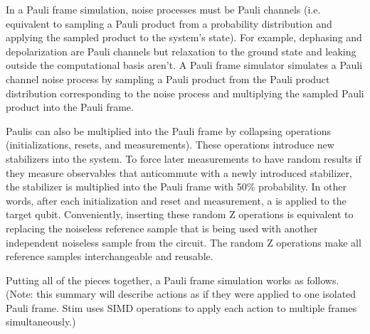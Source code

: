 \documentclass[onecolumn,unpublished]{quantumarticle}
\theoremstyle{definition}
\theoremstyle{definition}
\theoremstyle{definition}
\begin{document}
In a Pauli frame simulation, noise processes must be Pauli channels (i.e. equivalent to sampling a Pauli product from a probability distribution and applying the sampled product to the system's state).
For example, dephasing and depolarization are Pauli channels but relaxation to the ground state and leaking outside the computational basis aren't.
A Pauli frame simulator simulates a Pauli channel noise process by sampling a Pauli product from the Pauli product distribution corresponding to the noise process and multiplying the sampled Pauli product into the Pauli frame.

Paulis can also be multiplied into the Pauli frame by collapsing operations (initializations, resets, and measurements).
These operations introduce new stabilizers into the system.
To force later measurements to have random results if they measure observables that anticommute with a newly introduced stabilizer, the stabilizer is multiplied into the Pauli frame with 50\% probability.
In other words, after each initialization and reset and measurement, a  is applied to the target qubit.
Conveniently, inserting these random Z operations is equivalent to replacing the noiseless reference sample that is being used with another independent noiseless sample from the circuit.
The random Z operations make all reference samples interchangeable and reusable.

Putting all of the pieces together, a Pauli frame simulation works as follows.
(Note: this summary will describe actions as if they were applied to one isolated Pauli frame.
Stim uses SIMD operations to apply each action to multiple frames simultaneously.)
\end{document}
